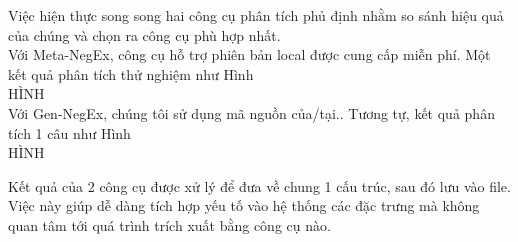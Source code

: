Việc hiện thực song song hai công cụ phân tích phủ định nhằm so sánh hiệu quả của chúng và chọn ra công cụ phù hợp nhất.\\

Với Meta-NegEx, công cụ hỗ trợ phiên bản local được cung cấp miễn phí. Một kết quả phân tích thử nghiệm như Hình\\
HÌNH\\

Với Gen-NegEx, chúng tôi sử dụng mã nguồn của/tại.. Tương tự, kết quả phân tích 1 câu như Hình \\
HÌNH

Kết quả của 2 công cụ được xử lý để đưa về chung 1 cấu trúc, sau đó lưu vào file. Việc này giúp dễ dàng tích hợp yếu tố vào hệ thống các đặc trưng mà không quan tâm tới quá trình trích xuất bằng công cụ nào.

